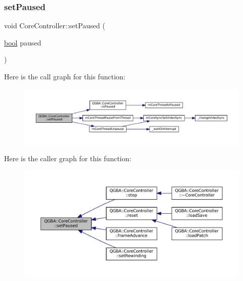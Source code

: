 \subsubsection{\texorpdfstring{set\+Paused}{setPaused}}
{\footnotesize\ttfamily void Core\+Controller\+::set\+Paused (\begin{DoxyParamCaption}\item[{\mbox{\hyperlink{libretro_8h_a4a26dcae73fb7e1528214a068aca317e}{bool}}}]{paused }\end{DoxyParamCaption})\hspace{0.3cm}{\ttfamily [slot]}}

Here is the call graph for this function\+:
\nopagebreak
\begin{figure}[H]
\begin{center}
\leavevmode
\includegraphics[width=350pt]{class_q_g_b_a_1_1_core_controller_a83007f6bad9e6a8414cbd71c7a498578_cgraph}
\end{center}
\end{figure}
Here is the caller graph for this function\+:
\nopagebreak
\begin{figure}[H]
\begin{center}
\leavevmode
\includegraphics[width=350pt]{class_q_g_b_a_1_1_core_controller_a83007f6bad9e6a8414cbd71c7a498578_icgraph}
\end{center}
\end{figure}
\mbox{\label{class_q_g_b_a_1_1_core_controller_a0d6489c3a46a52b7cc84ec28f36790be}} 
